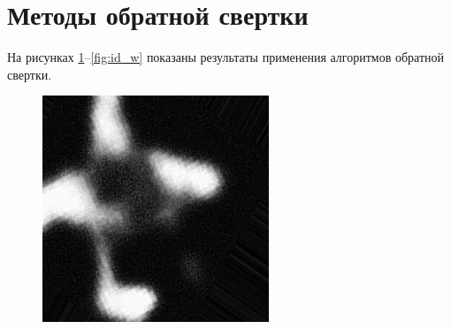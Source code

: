 \newpage

\section{Методы обратной свертки}

На рисунках \ref{fig:id_original}--\ref{fig:id_w} показаны результаты применения алгоритмов обратной свертки.

\begin{figure}[h!]
	\centering
	\begin{minipage}{.5\textwidth}
		\centering
		\includegraphics[width=0.8\linewidth]{inc/img/id_original}
		\label{fig:id_original}
	\end{minipage}%
\end{figure}

